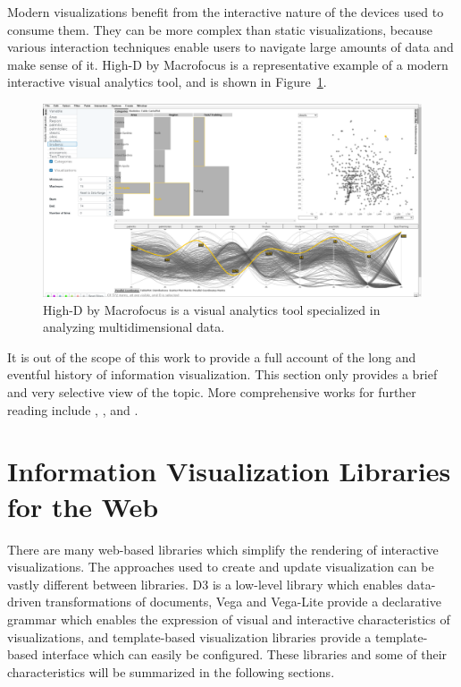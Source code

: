 Modern visualizations benefit from the interactive nature of the
devices used to consume them. They can be more complex than static
visualizations, because various interaction techniques enable users to
navigate large amounts of data and make sense of it. High-D by
Macrofocus \parencite{HighD} is a representative example of a modern
interactive visual analytics tool, and is shown in
Figure~\ref{fig:HighD}.

\begin{figure}[tp]
\centering
\includegraphics[keepaspectratio,width=\linewidth,height=\thirdh]
{images/high-d.png}
\caption[High-D]{
High-D by Macrofocus is a visual analytics tool
specialized in analyzing multidimensional data.
}
\label{fig:HighD}
\end{figure}




It is out of the scope of this work to provide a full account of the
long and eventful history of information visualization. This section
only provides a brief and very selective view of the topic.  More
comprehensive works for further reading include
\textcite{BriefHistoryOfDataVis},
\textcite{HistoryOfDataVisAndGraphicCommunication}, and
\textcite{HistoryOfInformationGraphics}.









\section{Information Visualization Libraries for the Web}

There are many web-based libraries which simplify the rendering of
interactive visualizations.  The approaches used to create and update
visualization can be vastly different between libraries.  D3 is a
low-level library which enables data-driven transformations of
documents, Vega and Vega-Lite provide a declarative grammar which
enables the expression of visual and interactive characteristics of
visualizations, and template-based visualization libraries provide a
template-based interface which can easily be configured.  These
libraries and some of their characteristics will be summarized in the
following sections.



